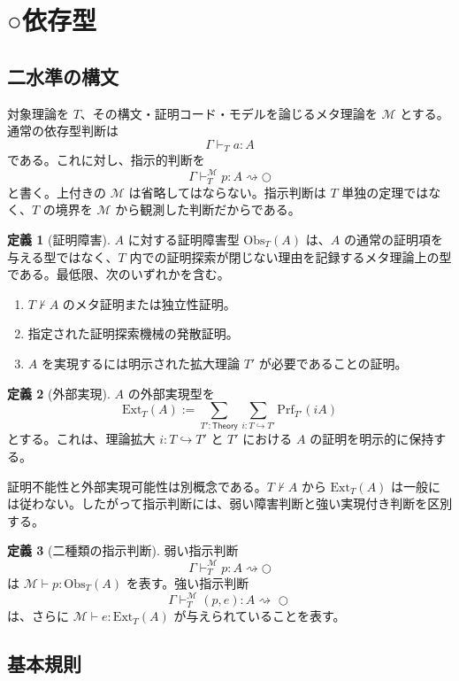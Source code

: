 \documentclass[a4paper,11pt]{ltjsarticle}
\theoremstyle{definition}
\newtheorem{definition}{定義}[section]
\theoremstyle{plain}
\newcommand{\dfix}{\bigcirc}
\newcommand{\Obs}{\mathrm{Obs}}
\newcommand{\Ext}{\mathrm{Ext}}
\newcommand{\Prf}{\mathrm{Prf}}
\newcommand{\Meta}{\mathcal{M}}
\begin{document}
\section{○依存型}

\subsection{二水準の構文}

対象理論を $T$、その構文・証明コード・モデルを論じるメタ理論を $\Meta$ とする。通常の依存型判断は
\[
 \Gamma\vdash_T a:A
\]
である。これに対し、指示的判断を
\[
 \Gamma\vdash^{\Meta}_T p:A\rightsquigarrow\dfix
\]
と書く。上付きの $\Meta$ は省略してはならない。指示判断は $T$ 単独の定理ではなく、$T$ の境界を $\Meta$ から観測した判断だからである。

\begin{definition}[証明障害]
$A$ に対する証明障害型 $\Obs_T(A)$ は、$A$ の通常の証明項を与える型ではなく、$T$ 内での証明探索が閉じない理由を記録するメタ理論上の型である。最低限、次のいずれかを含む。
\begin{enumerate}
 \item $T\nvdash A$ のメタ証明または独立性証明。
 \item 指定された証明探索機械の発散証明。
 \item $A$ を実現するには明示された拡大理論 $T'$ が必要であることの証明。
\end{enumerate}
\end{definition}

\begin{definition}[外部実現]
$A$ の外部実現型を
\[
 \Ext_T(A)
 :=
 \sum_{T':\mathsf{Theory}}
 \sum_{i:T\hookrightarrow T'}
 \Prf_{T'}(iA)
\]
とする。これは、理論拡大 $i:T\hookrightarrow T'$ と $T'$ における $A$ の証明を明示的に保持する。
\end{definition}

証明不能性と外部実現可能性は別概念である。$T\nvdash A$ から $\Ext_T(A)$ は一般には従わない。したがって指示判断には、弱い障害判断と強い実現付き判断を区別する。

\begin{definition}[二種類の指示判断]
弱い指示判断
\[
 \Gamma\vdash^{\Meta}_T p:A\rightsquigarrow\dfix
\]
は $\Meta\vdash p:\Obs_T(A)$ を表す。強い指示判断
\[
 \Gamma\vdash^{\Meta}_T (p,e):A\rightsquigarrow_{\!}\dfix
\]
は、さらに $\Meta\vdash e:\Ext_T(A)$ が与えられていることを表す。
\end{definition}

\subsection{基本規則}
\end{document}
